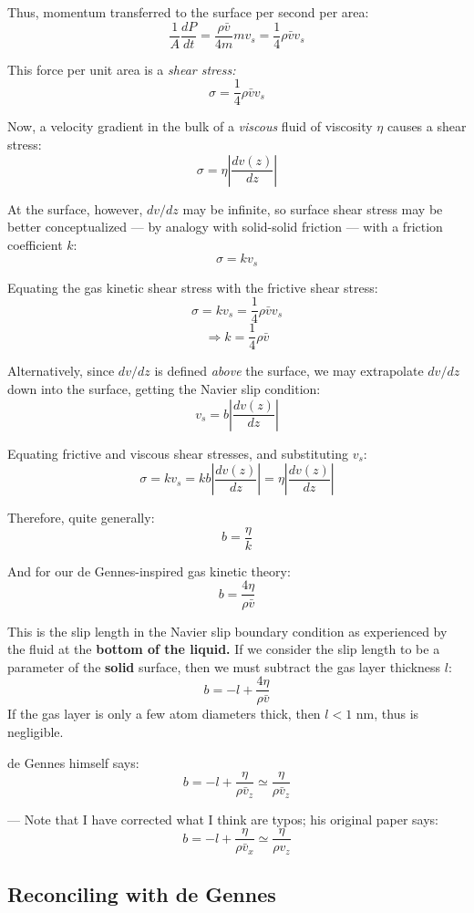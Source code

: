 \documentclass{paper}
\begin{document}
Thus, momentum transferred to the surface per second per area:
\[ \frac{1}{A} \frac{dP}{dt} = \frac{\rho \bar{v}}{4 m} m v_{s} 
= \frac{1}{4} \rho \bar{v} v_{s}  \]

This force per unit area is a \emph{shear stress:}
\[ \sigma = \frac{1}{4} \rho \bar{v} v_{s} \]

Now, a velocity gradient in the bulk of a \emph{viscous} fluid of viscosity $\eta$ causes a shear stress:
\[ \sigma = \eta \left| \frac{dv(z)}{dz} \right| \]

At the surface, however, $dv/dz$ may be infinite, so surface shear stress may be better conceptualized --- by analogy with solid-solid friction --- with a friction coefficient $k$:
\[ \sigma = k v_{s} \]

Equating the gas kinetic shear stress with the frictive shear stress:
\[ \sigma = k v_{s} = \frac{1}{4} \rho \bar{v} v_{s} \]
\[ \Rightarrow k = \frac{1}{4} \rho \bar{v} \]

Alternatively, since $dv/dz$ is defined \emph{above} the surface, we may extrapolate $dv/dz$ down into the surface, getting the Navier slip condition:
\[ v_{s} = b \left| \frac{dv(z)}{dz} \right| \]

Equating frictive and viscous shear stresses, and substituting $v_{s}$:
\[\sigma = k v_{s} = k b \left| \frac{dv(z)}{dz} \right| = \eta \left| \frac{dv(z)}{dz} \right| \]

Therefore, quite generally:
\[ b = \frac{\eta}{k} \]


And for our de Gennes-inspired gas kinetic theory:
\[ b = \frac{4 \eta}{\rho \bar{v}} \]

This is the slip length in the Navier slip boundary condition as experienced by the fluid at the \textbf{bottom of the liquid.}  If we consider the slip length to be a parameter of the \textbf{solid} surface, then we must subtract the gas layer thickness $l$:
\[ b = -l + \frac{4 \eta}{\rho \bar{v}} \]
If the gas layer is only a few atom diameters thick, then $l < 1$ nm, thus is negligible.

de Gennes himself says: 
\[ b = -l + \frac{\eta}{\rho \bar{v}_{z}} \simeq  \frac{\eta}{\rho \bar{v}_{z}} \]

--- Note that I have corrected what I think are typos; his original paper says:
\[ b = -l + \frac{\eta}{\rho \bar{v}_{x}} \simeq  \frac{\eta}{\rho v_{z}} \]

\subsection*{Reconciling with de Gennes}
\end{document}
